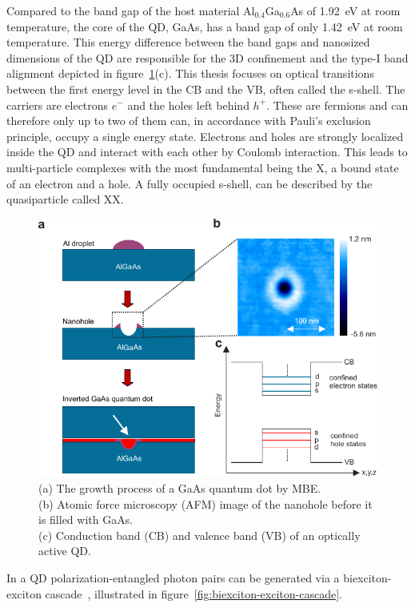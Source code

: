 Compared to the band gap of the host material Al$_{0.4}$Ga$_{0.6}$As of \SI{1.92}{\electronvolt} at room temperature, the core of the \ac{QD}, \ac{GaAs}, has a band gap of only \SI{1.42}{\electronvolt} at room temperature.
This energy difference between the band gaps and nanosized dimensions of the \ac{QD} are responsible for the 3D confinement and the type-I band alignment depicted in figure~\ref{fig:droplet-etched-gaas-qds}(c).
This thesis focuses on optical transitions between the first energy level in the \ac{CB} and the \ac{VB}, often called the s-shell.
The carriers are electrons $e^-$ and the holes left behind $h^+$.
These are fermions and can therefore only up to two of them can, in accordance with Pauli's exclusion principle, occupy a single energy state.
Electrons and holes are strongly localized inside the \ac{QD} and interact with each other by Coulomb interaction.
This leads to multi-particle complexes with the most fundamental being the \acf{X}, a bound state of an electron and a hole.
A fully occupied s-shell, can be described by the quasiparticle called \acf{XX}.
\begin{figure}[H]
	\centering
	\includegraphics[width=0.8\linewidth]{figures/quantum-dot/droplet-etched-gaas-qds}
	\caption[Droplet etched GaAs quantum dots.]{(a) The growth process of a GaAs quantum dot by \ac{MBE}.\\
	(b) Atomic force microscopy (\acs{AFM}) image of the nanohole before it is filled with GaAs.\\
    (c) Conduction band (CB) and valence band (VB) of an optically active \ac{QD}.~\cite{huber_gaas_2019}}
	\label{fig:droplet-etched-gaas-qds}
\end{figure}
In a \ac{QD} polarization-entangled photon pairs can be generated via a biexciton-exciton cascade~\cite{stevenson_semiconductor_2006}, illustrated in figure~\ref{fig:biexciton-exciton-cascade}.
